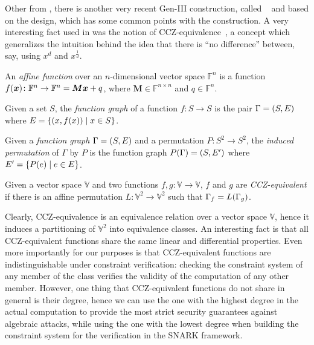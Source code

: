 Other from \Griffin, there is another very recent Gen-III construction, called 
\Anemoi~\cite{BouvierBCPSVW2022} and based on the \Flystel{} design, which has some common points 
with the \Horst{} construction.
A very interesting fact used in \Flystel{} was the notion of CCZ-equivalence~\cite{CarletCZ1998},
a concept which generalizes the intuition behind the idea that there is ``no difference'' 
between, say, using \(x^{d}\) and \(x^{\frac{1}{d}}\).
\begin{definition}
  An \emph{affine function} over an \(n\)-dimensional vector space \(\mathbb{F}^n\) is a function
  \(\call{f}{\bm{x}}\colon \mathbb{F}^n \to \mathbb{F}^n = \bm{Mx} + q\), where 
  \(\bm{M} \in \mathbb{F}^{n \times n}\) and \(q \in \mathbb{F}^n\).
\end{definition}
\begin{definition}
  Given a set \(S\), the \emph{function graph} of a function \(f\colon S \to S\) is the pair 
  \(\Gamma = \left(S, E\right)\) where \(E = \Set{\Tuple{x, \call{f}{x}} \mid x \in S}\).
\end{definition}
\begin{definition}
  Given a \emph{function graph} \(\Gamma = \left(S, E\right)\) and a permutation \(P\colon S^2 \to S^2\), 
  the \emph{induced permutation} of \(\Gamma \) by \(P\) is the function graph 
  \(\call{P}{\Gamma} = \Tuple{S, E'}\) where \(E' = \Set{\call{P}{e} \mid e \in E}\).
\end{definition}
\begin{definition}
  Given a vector space \(\mathbb{V}\) and two functions 
  \(f,g\colon \mathbb{V} \to \mathbb{V}\), \(f\) and \(g\) are \emph{CCZ-equivalent} if there 
  is an affine permutation \(L\colon \mathbb{V}^2 \to \mathbb{V}^2\) such 
  that \(\Gamma_{f} = \call{L}{\Gamma_{g}}\).
\end{definition}

Clearly, CCZ-equivalence is an equivalence relation over a vector space \(\mathbb{V}\), hence it 
induces a partitioning of \(\mathbb{V}^2\) into equivalence classes.
An interesting fact is that all CCZ-equivalent functions share the same linear and differential 
properties.
Even more importantly for our purposes is that CCZ-equivalent functions are indistinguishable under 
constraint verification: checking the constraint system of any member of the class verifies 
the validity of the computation of any other member.
However, one thing that CCZ-equivalent functions do not share in general is their degree, hence we 
can use the one with the highest degree in the actual computation to provide the most strict security 
guarantees against algebraic attacks, while using the one with the lowest degree when building
the constraint system for the verification in the SNARK framework.

